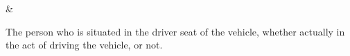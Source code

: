 



\Driver      & \begin{minipage}{\GlossaryColumnWidth}{%
The person who is situated in the driver seat of the vehicle, whether actually in the act of driving the vehicle, or not. 
}\end{minipage}\\ \hline%




